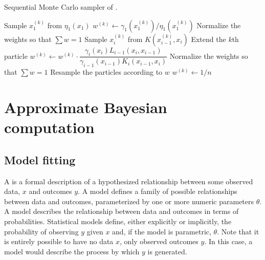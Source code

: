 \begin{algorithm}
  \caption{Sequential Monte Carlo sampler of \textcite{del2006sequential}.}
  \begin{algorithmic}
      \State Sample $x_1^{(k)}$ from $\eta_1(x_1)$
      \State $w^{(k)} \gets \gamma_1(x_1^{(k)}) / \eta_1(x_1^{(k)})$
      \State Normalize the weights so that $\sum w = 1$
    \EndFor
        \State Sample $x_i^{(k)}$ from $K(x_{i-1}^{(k)}, x_i)$
        \Comment Extend the $k$th particle
        \State $w^{(k)} \gets w^{(k)} \cdot \dfrac{\gamma_i(x_i) L_{i-1}(x_i, x_{i-1})}{\gamma_{i-1}(x_{i-1}) K_i(x_{i-1}, x_i)}$
      \EndFor
      \State Normalize the weights so that $\sum w = 1$
        \State Resample the particles according to $w$
          \State $w^{(k)} \gets 1/n$
        \EndFor
      \EndIf
    \EndFor
  \end{algorithmic}
  \label{alg:smcsamp}
\end{algorithm}

\section{Approximate Bayesian computation}
\label{sec:abc}


\subsection{Model fitting}
\label{subsec:mfit}

A  is a formal description of a hypothesized
relationship between some observed data, $x$ and outcomes $y$. A
 model defines a family of possible relationships between data
and outcomes, parameterized by one or more numeric parameters $\theta$. A
 model describes the relationship between data and outcomes
in terms of probabilities. Statistical models define, either explicitly or
implicitly, the probability of observing $y$ given $x$ and, if the model is
parametric, $\theta$. Note that it is entirely possible to have no data $x$,
only observed outcomes $y$. In this case, a model would describe the process by
which $y$ is generated.


